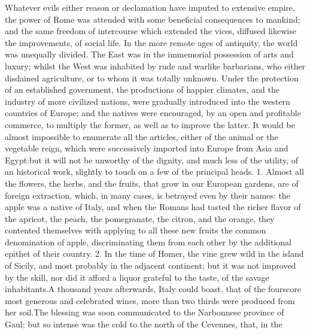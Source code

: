 

Whatever evils either reason or declamation have imputed to
extensive empire, the power of Rome was attended with some
beneficial consequences to mankind; and the same freedom of
intercourse which extended the vices, diffused likewise the
improvements, of social life. In the more remote ages of
antiquity, the world was unequally divided. The East was in the
immemorial possession of arts and luxury; whilst the West was
inhabited by rude and warlike barbarians, who either disdained
agriculture, or to whom it was totally unknown. Under the
protection of an established government, the productions of
happier climates, and the industry of more civilized nations,
were gradually introduced into the western countries of Europe;
and the natives were encouraged, by an open and profitable
commerce, to multiply the former, as well as to improve the
latter. It would be almost impossible to enumerate all the
articles, either of the animal or the vegetable reign, which were
successively imported into Europe from Asia and Egypt:\footnotemark[93] but it
will not be unworthy of the dignity, and much less of the
utility, of an historical work, slightly to touch on a few of the
principal heads. 1. Almost all the flowers, the herbs, and the
fruits, that grow in our European gardens, are of foreign
extraction, which, in many cases, is betrayed even by their
names: the apple was a native of Italy, and when the Romans had
tasted the richer flavor of the apricot, the peach, the
pomegranate, the citron, and the orange, they contented
themselves with applying to all these new fruits the common
denomination of apple, discriminating them from each other by the
additional epithet of their country. 2. In the time of Homer, the
vine grew wild in the island of Sicily, and most probably in the
adjacent continent; but it was not improved by the skill, nor did
it afford a liquor grateful to the taste, of the savage
inhabitants.\footnotemark[94] A thousand years afterwards, Italy could boast,
that of the fourscore most generous and celebrated wines, more
than two thirds were produced from her soil.\footnotemark[95] The blessing was
soon communicated to the Narbonnese province of Gaul; but so
intense was the cold to the north of the Cevennes, that, in the
